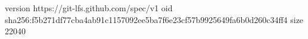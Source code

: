 version https://git-lfs.github.com/spec/v1
oid sha256:f5b271df77cba4ab91c1157092ee5ba7f6e23cf57b9925649fa6b0d260c34ff4
size 22040
